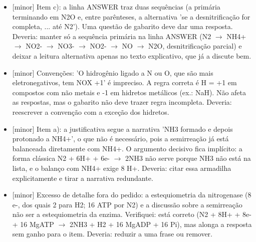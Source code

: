 \documentclass{article}%
\begin{document}
\begin{itemize}%
\item%
{[}minor{]} Item c): a linha ANSWER traz duas sequências (a primária terminando em N2O e, entre parênteses, a alternativa 'se a desnitrificação for completa, ... até N2'). Uma questão de gabarito deve dar uma resposta. Deveria: manter só a sequência primária na linha ANSWER (N2 $\to$ NH4+ $\to$ NO2{-} $\to$ NO3{-} $\to$ NO2{-} $\to$ NO $\to$ N2O, desnitrificação parcial) e deixar a leitura alternativa apenas no texto explicativo, que já a discute bem.%
\item%
{[}minor{]} Convenções: 'O hidrogênio ligado a N ou O, que são mais eletronegativos, tem NOX +1' é impreciso. A regra correta é H = +1 em compostos com não metais e -1 em hidretos metálicos (ex.: NaH). Não afeta as respostas, mas o gabarito não deve trazer regra incompleta. Deveria: reescrever a convenção com a exceção dos hidretos.%
\item%
{[}minor{]} Item a): a justificativa segue a narrativa 'NH3 formado e depois protonado a NH4+', o que não é necessário, pois a semirreação já está balanceada diretamente com NH4+. O argumento decisivo fica implícito: a forma clássica N2 + 6H+ + 6e{-} $\to$ 2NH3 não serve porque NH3 não está na lista, e o balanço com NH4+ exige 8 H+. Deveria: citar essa armadilha explicitamente e tirar a narrativa redundante.%
\item%
{[}minor{]} Excesso de detalhe fora do pedido: a estequiometria da nitrogenase (8 e-, dos quais 2 para H2; 16 ATP por N2) e a discussão sobre a semirreação não ser a estequiometria da enzima. Verifiquei: está correto (N2 + 8H+ + 8e- + 16 MgATP $\to$ 2NH3 + H2 + 16 MgADP + 16 Pi), mas alonga a resposta sem ganho para o item. Deveria: reduzir a uma frase ou remover.%
\end{itemize}%
\end{document}
